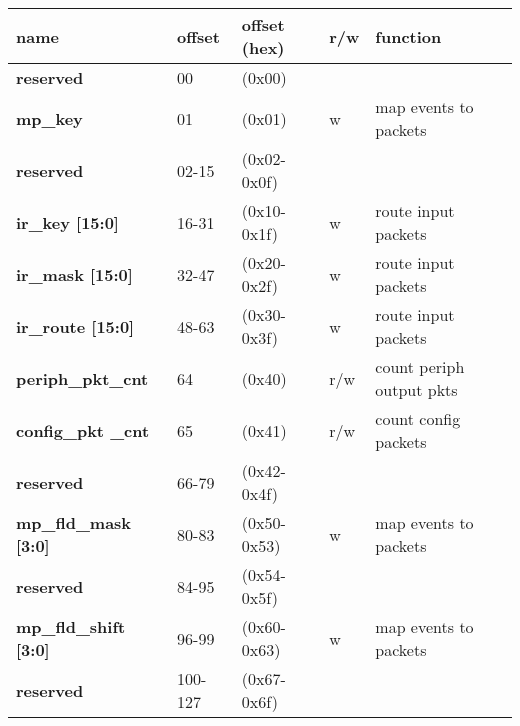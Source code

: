 \documentclass[11pt,a4paper,twoside]{article}
\begin{document}
\begin{center}
	\begin{tabularx}{\textwidth}{| p{34mm} p{13mm} p{21mm} p{7mm} X |}
		\hline
		\textbf{name} & \textbf{offset} & \textbf{offset} (hex) & \textbf{r/w} & \textbf{function} \\%
		\hline
		\hline
		\cellcolor{gray!25}\textbf{reserved} & \cellcolor{gray!25}00      & \cellcolor{gray!25}(0x00)      & \cellcolor{gray!25} & \cellcolor{gray!25}\\%
		\textbf{mp\_key}                     & 01                         & (0x01)                         & w                   & map events to packets \\%
		\cellcolor{gray!25}\textbf{reserved} & \cellcolor{gray!25}02-15   & \cellcolor{gray!25}(0x02-0x0f) & \cellcolor{gray!25} & \cellcolor{gray!25}\\%
		\textbf{ir\_key [15:0]}              & 16-31                      & (0x10-0x1f)                    & w                   & route input packets \\%
		\textbf{ir\_mask [15:0]}             & 32-47                      & (0x20-0x2f)                    & w                   & route input packets \\%
		\textbf{ir\_route [15:0]}            & 48-63                      & (0x30-0x3f)                    & w                   & route input packets \\%
		\textbf{periph\_pkt\_cnt}            & 64                         & (0x40)                         & r/w                 & count periph output pkts\\%
		\textbf{config\_pkt \_cnt}           & 65                         & (0x41)                         & r/w                 & count config packets \\%
		\cellcolor{gray!25}\textbf{reserved} & \cellcolor{gray!25}66-79   & \cellcolor{gray!25}(0x42-0x4f) & \cellcolor{gray!25} & \cellcolor{gray!25}\\%
		\textbf{mp\_fld\_mask [3:0]}         & 80-83                      & (0x50-0x53)                    & w                   & map events to packets \\%
		\cellcolor{gray!25}\textbf{reserved} & \cellcolor{gray!25}84-95   & \cellcolor{gray!25}(0x54-0x5f) & \cellcolor{gray!25} & \cellcolor{gray!25}\\%
		\textbf{mp\_fld\_shift [3:0]}        & 96-99                      & (0x60-0x63)                    & w                   & map events to packets \\%
		\cellcolor{gray!25}\textbf{reserved} & \cellcolor{gray!25}100-127 & \cellcolor{gray!25}(0x67-0x6f) & \cellcolor{gray!25} & \cellcolor{gray!25}\\%
		\hline
	\end{tabularx}
\end{center}
\end{document}
